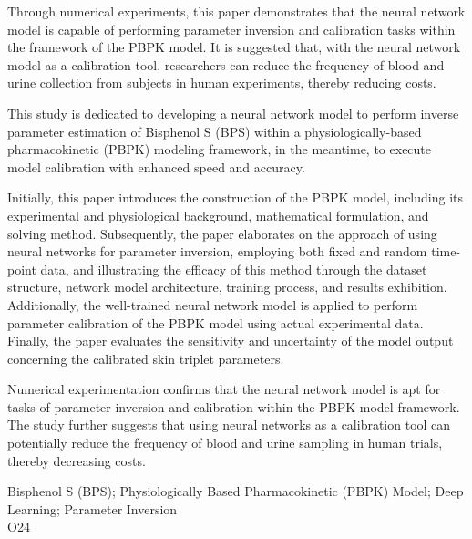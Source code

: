 \documentclass[a4paper,punct=banjiao,twoside]{ctexrep}
\theoremstyle{plain}
\theoremstyle{definition}
\theoremstyle{remark}
\begin{document}
Through numerical experiments, this paper demonstrates that the neural network model is capable of performing parameter inversion and calibration tasks within the framework of the PBPK model. It is suggested that, with the neural network model as a calibration tool, researchers can reduce the frequency of blood and urine collection from subjects in human experiments, thereby reducing costs.
\fi

This study is dedicated to developing a neural network model to perform inverse parameter estimation of Bisphenol S (BPS) within a 
physiologically-based pharmacokinetic (PBPK) modeling framework, in the meantime,  to execute model calibration with enhanced speed and accuracy.

Initially, this paper introduces the construction of the PBPK model, including its experimental and physiological background, 
 mathematical formulation, and solving method. Subsequently, the paper elaborates on the approach of using neural networks for 
 parameter inversion, employing both fixed and random time-point data, and illustrating the efficacy of this method through the dataset structure,
  network model architecture, training process, and results exhibition. 
  Additionally, the well-trained neural network model is applied to perform parameter calibration of the PBPK model using actual experimental data. 
  Finally, the paper evaluates the sensitivity and uncertainty of the model output concerning the calibrated skin triplet parameters.
  
  Numerical experimentation confirms that the neural network model is apt for tasks of parameter inversion and calibration within the PBPK model 
  framework. The study further suggests that using neural networks as a calibration tool can potentially reduce the frequency of blood and urine 
  sampling in human trials, thereby decreasing costs.


 Bisphenol S (BPS); Physiologically Based Pharmacokinetic (PBPK) Model; Deep Learning; Parameter Inversion\\
 O24

\clearpage
\mbox{}
\thispagestyle{empty}




\renewcommand{\thepage}{\arabic{page}}
\setcounter{page}{0}
\end{document}
